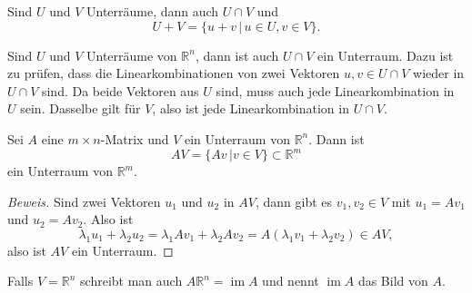 \begin{satz} Sind $U$ und $V$ Unterräume, dann auch $U\cap V$ und
\[
U+V=\{u+v\,|\,u\in U,v\in V\}.
\]
\end{satz}

Sind $U$ und $V$ Unterräume von $\mathbb R^n$, dann ist auch
$U\cap V$ ein Unterraum.
Dazu ist zu prüfen, dass die Linearkombinationen
von zwei Vektoren $u,v\in U\cap V$ wieder in $U\cap V$ sind.
Da beide Vektoren aus $U$ sind, muss auch jede Linearkombination in $U$ sein.
Dasselbe gilt für $V$, also ist jede Linearkombination in $U\cap V$.

\begin{satz}
Sei $A$ eine $m\times n$-Matrix und $V$ ein Unterraum von $\mathbb R^n$.
Dann ist
\[
AV=\{ Av\,|v\in V\}\subset\mathbb R^m
\]
ein Unterraum von $\mathbb R^m$.
\end{satz}
\begin{proof}[Beweis]
Sind zwei Vektoren $u_1$ und $u_2$ in $AV$, dann gibt es $v_1,v_2\in V$ mit
$u_1=Av_1$ und $u_2=Av_2$.
Also ist
\[
\lambda_1u_1+\lambda_2u_2
=
\lambda_1Av_1+\lambda_2Av_2
=
A(\lambda_1v_1+\lambda_2v_2)\in AV,
\]
also ist $AV$ ein Unterraum.
\end{proof}
Falls $V=\mathbb R^n$ schreibt man auch $A\mathbb R^n=\operatorname{im}A$
und nennt $\operatorname{im}A$ das Bild von $A$.

